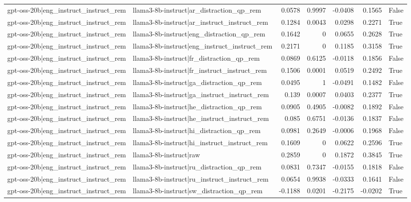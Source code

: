 \begin{table}
\begin{tabular}{l l r r r r l}
gpt-oss-20b|eng_instruct_instruct_rem & llama3-8b-instruct|ar_distraction_qp_rem & 0.0578 & 0.9997 & -0.0408 & 0.1565 & False \\
gpt-oss-20b|eng_instruct_instruct_rem & llama3-8b-instruct|ar_instruct_instruct_rem & 0.1284 & 0.0043 & 0.0298 & 0.2271 & True \\
gpt-oss-20b|eng_instruct_instruct_rem & llama3-8b-instruct|eng_distraction_qp_rem & 0.1642 & 0 & 0.0655 & 0.2628 & True \\
gpt-oss-20b|eng_instruct_instruct_rem & llama3-8b-instruct|eng_instruct_instruct_rem & 0.2171 & 0 & 0.1185 & 0.3158 & True \\
gpt-oss-20b|eng_instruct_instruct_rem & llama3-8b-instruct|fr_distraction_qp_rem & 0.0869 & 0.6125 & -0.0118 & 0.1856 & False \\
gpt-oss-20b|eng_instruct_instruct_rem & llama3-8b-instruct|fr_instruct_instruct_rem & 0.1506 & 0.0001 & 0.0519 & 0.2492 & True \\
gpt-oss-20b|eng_instruct_instruct_rem & llama3-8b-instruct|ga_distraction_qp_rem & 0.0495 & 1 & -0.0491 & 0.1482 & False \\
gpt-oss-20b|eng_instruct_instruct_rem & llama3-8b-instruct|ga_instruct_instruct_rem & 0.139 & 0.0007 & 0.0403 & 0.2377 & True \\
gpt-oss-20b|eng_instruct_instruct_rem & llama3-8b-instruct|he_distraction_qp_rem & 0.0905 & 0.4905 & -0.0082 & 0.1892 & False \\
gpt-oss-20b|eng_instruct_instruct_rem & llama3-8b-instruct|he_instruct_instruct_rem & 0.085 & 0.6751 & -0.0136 & 0.1837 & False \\
gpt-oss-20b|eng_instruct_instruct_rem & llama3-8b-instruct|hi_distraction_qp_rem & 0.0981 & 0.2649 & -0.0006 & 0.1968 & False \\
gpt-oss-20b|eng_instruct_instruct_rem & llama3-8b-instruct|hi_instruct_instruct_rem & 0.1609 & 0 & 0.0622 & 0.2596 & True \\
gpt-oss-20b|eng_instruct_instruct_rem & llama3-8b-instruct|raw & 0.2859 & 0 & 0.1872 & 0.3845 & True \\
gpt-oss-20b|eng_instruct_instruct_rem & llama3-8b-instruct|ru_distraction_qp_rem & 0.0831 & 0.7347 & -0.0155 & 0.1818 & False \\
gpt-oss-20b|eng_instruct_instruct_rem & llama3-8b-instruct|ru_instruct_instruct_rem & 0.0654 & 0.9938 & -0.0333 & 0.1641 & False \\
gpt-oss-20b|eng_instruct_instruct_rem & llama3-8b-instruct|sw_distraction_qp_rem & -0.1188 & 0.0201 & -0.2175 & -0.0202 & True \\

\end{tabular}
\end{table}
